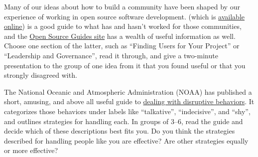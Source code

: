 
Many of our ideas about how to build a community have been shaped by
our experience of working in open source software development.
\cite{Foge2005} (which is \href{http://producingoss.com/}{available
  online}) is a good guide to what has and hasn't worked for those
communities, and the \href{https://opensource.guide/}{Open Source
  Guides site} has a wealth of useful information as well.  Choose one
section of the latter, such as ``Finding Users for Your Project'' or
``Leadership and Governance'', read it through, and give a two-minute
presentation to the group of one idea from it that you found useful or
that you strongly disagreed with.


The National Oceanic and Atmospheric Administration (NOAA) has
published a short, amusing, and above all useful guide to
\href{https://coast.noaa.gov/ddb/story_html5.html}{dealing with
  disruptive behaviors}. It categorizes those behaviors under labels
like ``talkative'', ``indecisive'', and ``shy'', and outlines
strategies for handling each.  In groups of 3--6, read the guide and
decide which of these descriptions best fits you.  Do you think the
strategies described for handling people like you are effective?  Are
other strategies equally or more effective?
